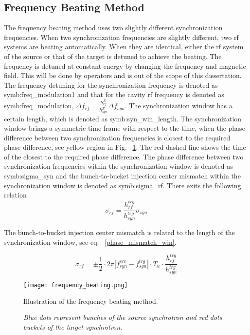 
\subsection{Frequency Beating Method}
\label{subsec:beating}

The frequency beating method uses two slightly different synchronization frequencies. When two synchronization frequencies are slightly different, two rf systems are beating automatically. When they are identical, either the rf system of the source or that of the target is detuned to achieve the beating. The frequency is detuned at constant energy by changing the frequency and magnetic field. This will be done by operators and is out of the scope of this dissertation. The frequency detuning for the synchronization frequency is denoted as \gls{symb:freq_modulation1} and that for the cavity rf frequency is denoted as \gls{symb:freq_modulation},  $\Delta f_\mathit{rf}=\frac{h_{\mathit{rf}}^\mathit{X}}{h_{\mathit{syn}}^\mathit{X}} \Delta f_\mathit{syn}$. The synchronization window has a certain length, which is denoted as \gls{symb:syn_win_length}. The synchronization window brings a symmetric time frame with respect to the time, when the phase difference between two synchronization frequencies is closest to the required phase difference, see yellow region in Fig. ~\ref{frequency_beat}. The red dashed line shows the time of the closest to the required phase difference. The phase difference between  two synchronization frequencies within the synchronization window is denoted as \gls{symb:sigma_syn} and the bunch-to-bucket injection center mismatch within the synchronization window is denoted as \gls{symb:sigma_rf}. There exits the following relation
\begin{equation}
\sigma_\mathit{rf}=\frac{h_{\mathit{rf}}^\mathit{trg}}{h_{\mathit{syn}}^\mathit{trg}}\sigma_\mathit{syn}
\end{equation}

The bunch-to-bucket injection center mismatch is related to the length of the synchronization window, see eq. ~\ref{phase_mismatch_win}. %

\begin{equation}
\sigma_\mathit{rf}=\pm \frac{1}{2}\cdot 2\pi|f_{\mathit{syn}}^\mathit{src}-f_{\mathit{syn}}^\mathit{trg}|\cdot T_\mathit{w} \cdot \frac{h_{\mathit{rf}}^\mathit{trg}}{h_{\mathit{syn}}^\mathit{trg}}\label{phase_mismatch_win}
\end{equation}
\begin{figure}[!htb]
   \centering   
   \texttt{[image: frequency\_beating.png]}
   \caption{Illustration of the frequency beating method.}
	\caption*{\textsl{\small{Blue dots represent bunches of the source synchrotron and red dots buckets of the target synchrotron.}}}
   \label{frequency_beat}
\end{figure}


